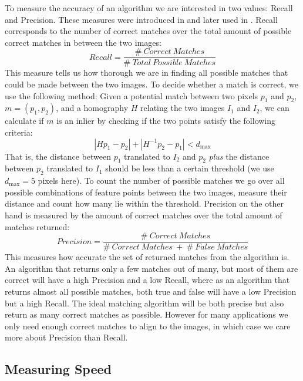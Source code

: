 To measure the accuracy of an algorithm we are interested in two values:
Recall and Precision. These measures were introduced in \cite{ke2004pca}
and later used in \cite{mikolajczyk2005performance}. Recall corresponds 
to the number of correct matches over the total amount of possible 
correct matches in between the two images:
\begin{equation*}
	Recall = \frac{\# ~ Correct ~ Matches}{\# ~ Total ~ Possible ~ 
	Matches}
\end{equation*}
This measure tells us how thorough we are in finding all possible 
matches that could be made between the two images. To decide whether a 
match is correct, we use the following method:
Given a potential match between two pixels $p_1$ and $p_2$, $m = 
\left(p_1, p_2\right)$, and a homography $H$ relating the two images 
$I_1$ and $I_2$, we can calculate if $m$ is an inlier by checking if the 
two points satisfy the following criteria:
\begin{equation*}
\left\vert H p_1 - p_2 \right\vert + \left\vert H^{-1}p_2 - p_1 \right\vert < d_{\max}
\end{equation*}
That is, the distance between $p_1$ translated to $I_2$ and $p_2$ 
\emph{plus} the distance between $p_2$ translated to $I_1$ should be 
less than a certain threshold (we use $d_{\max}=5$ pixels here). To 
count the number of possible matches we go over all possible 
combinations of feature points between the two images, measure their 
distance and count how many lie within the threshold.
Precision on the other hand is measured by the amount of correct matches
over the total amount of matches returned:
\begin{equation*}
	Precision = \frac{\# ~ Correct ~ Matches}{\# ~ Correct ~ Matches ~ + 
	~ \# ~ False ~ Matches}
\end{equation*}
This measures how accurate the set of returned matches from the 
algorithm is. An algorithm that returns only a few matches out of many, 
but most of them are correct will have a high Precision and a low 
Recall, where as an algorithm that returns almost all possible matches, 
both true and false will have a low Precision but a high Recall. The 
ideal matching algorithm will be both precise but also return as many 
correct matches as possible. However for many applications we only need 
enough correct matches to align to the images, in which case we care 
more about Precision than Recall. 

\subsection{Measuring Speed}

